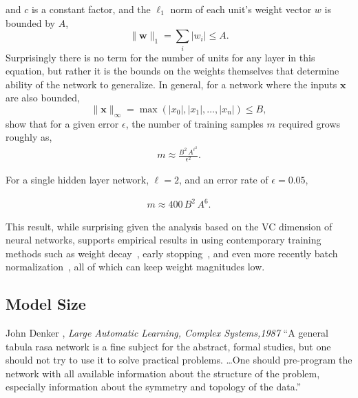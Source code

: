 \documentclass[thesis]{subfiles}
\begin{document}
    and $c$ is a constant factor, and the $\ell_1$ norm of each unit's weight vector $w$ is bounded by $A$, 
    \begin{equation}
    \|\mathbf{w}\|_1 = \sum_i | w_i | \leq A.
    \end{equation}
    Surprisingly there is no term for the number of units for any layer in this equation, but rather it is the bounds on the weights themselves that determine ability of the network to generalize. In general, for a network where the inputs $\mathbf{x}$ are also bounded,
    \begin{equation}
        \|\mathbf{x}\|_\infty = \max(|x_0|, |x_1|, \ldots, |x_n|) \leq B,
    \end{equation}
    \citet{bartlett1997} show that for a given error $\epsilon$, the number of training samples $m$ required grows roughly as,
    \begin{align}
        m \approx \frac{B^2\,A^{\ell^2}}{\epsilon^2}.
    \end{align}
    
     For a single hidden layer network, \ie $\ell=2$, and an error rate of $\epsilon=0.05$, 
    
    \begin{align}
        m \approx 400\,B^2\,A^6.
    \end{align}
    
    This result, while surprising given the analysis based on the VC dimension of neural networks, supports empirical results in using contemporary training methods such as weight decay~\citep{hinton1987learning}, early stopping~\citep{Bishop1995}, and even more recently batch normalization~\citep{Ioffe2015}, all of which can keep weight magnitudes low.
    
	
    \subsection{Model Size}
	\begin{chapquote}{John Denker \etal, \textit{Large Automatic Learning, Complex Systems,1987}}
		``A general tabula rasa network is a fine subject for the abstract, formal studies, but one should not try to use it to solve practical problems. \ldots One should pre-program the network with all available information about the structure of the problem, especially information about the symmetry and topology of the data.''
	\end{chapquote}
	
\end{document}
